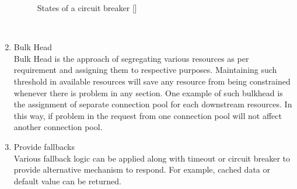 \begin{enumerate}
\begin{figure}[H]
\begin{center}
\caption{States of a circuit breaker [\cite{Fowler:2014ac}]}
\label{fig:challanges_of_microservices_architecture/integration/inter_service_communication/states_of_circuit_breaker}
\end{center}
\end{figure}
\\
\item Bulk Head \\ Bulk Head is the approach of segregating various resources as per requirement and assigning them to respective purposes. Maintaining such threshold in available resources will save any resource from being constrained whenever there is problem in any section. One example of such bulkhead is the assignment of separate connection pool for each downstream resources. In this way, if problem in the request from one connection pool will not affect another connection pool. \cite{Newman:2015aa} \cite{Nygard:2007aa}
\item Provide fallbacks \\ Various fallback logic can be applied along with timeout or circuit breaker to provide alternative mechanism to respond. For example, cached data or default value can be returned. 
\end{enumerate}
\\
